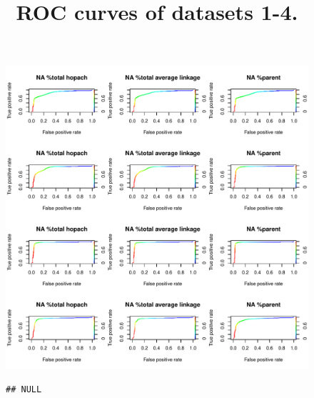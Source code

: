 \documentclass[11pt,a4paper,twoside]{report}\usepackage[]{graphicx}\usepackage[]{color}
\makeatletter
\def\maxwidth{ %
  \ifdim\Gin@nat@width>\linewidth
    \linewidth
  \else
    \Gin@nat@width
  \fi
}
\newenvironment{kframe}{%
 \def\at@end@of@kframe{}%
 \ifinner\ifhmode%
  \def\at@end@of@kframe{\end{minipage}}%
  \begin{minipage}{\columnwidth}%
 \fi\fi%
 \def\FrameCommand##1{\hskip\@totalleftmargin \hskip-\fboxsep
 \colorbox{shadecolor}{##1}\hskip-\fboxsep
     \hskip-\linewidth \hskip-\@totalleftmargin \hskip\columnwidth}%
 \MakeFramed {\advance\hsize-\width
   \@totalleftmargin\z@ \linewidth\hsize
   \@setminipage}}%
 {\par\unskip\endMakeFramed%
 \at@end@of@kframe}
\newenvironment{knitrout}{}{} %
\makeatother
\begin{document}
\begin{figure}
\begin{knitrout}
\includegraphics[width=\maxwidth]{figure/unnamed-chunk-1-3} 
\begin{kframe}\begin{verbatim}
## NULL
\end{verbatim}
\end{kframe}
\end{knitrout}
\title{ROC curves of datasets 1-4.\label{fig:1}}
\end{figure}
\end{document}
